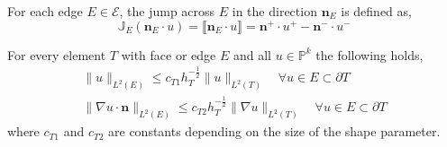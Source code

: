 \begin{definition} \label{def:jump}
For each edge $E \in \mathcal{E}$, the jump across $E$ in the direction $\mathbf{n}_E$ is defined as,
\begin{equation}
\mathbb{J}_E(\mathbf{n}_E \cdot u) = \llbracket \mathbf{n}_E\cdot u \rrbracket =  \mathbf{n}^+ \cdot u ^+ - \mathbf{n}^- \cdot u ^-
\end{equation}
\end{definition}

\begin{theorem}\label{def:trace}
For every element $T$ with face or edge $E$ and all $u \in \mathbb{P}^k$ the following holds,
\begin{align*}
\|u\|_{L^2(E)} \leq c_{T1} h_T^{-\frac{1}{2}}\|u\|_{L^2(T)} \quad \forall u \in E \subset \partial T \\
\|\nabla u \cdot \mathbf{n}\|_{L^2(E)} \leq c_{T2} h_T^{-\frac{1}{2}}\|\nabla u\|_{L^2(T)} \quad \forall u \in E \subset \partial T
\end{align*}
where $c_{T1}$ and $c_{T2}$ are constants depending on the size of the shape parameter. 
\end{theorem}